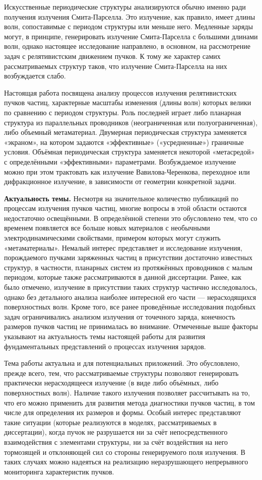 Искусственные периодические структуры анализируются обычно именно ради получения излучения Смита-Парселла. Это излучение, как правило, имеет длины волн, сопоставимые с периодом структуры или меньше него. Медленные заряды могут, в принципе, генерировать излучение Смита-Парселла с большими длинами волн, однако настоящее исследование направлено, в основном, на рассмотрение задач с релятивистским движением пучков. К тому же характер самих рассматриваемых структур таков, что излучение Смита-Парселла на них возбуждается слабо.  

Настоящая работа посвящена анализу процессов излучения релятивистских пучков частиц, характерные масштабы изменения (длины волн) которых велики по сравнению с периодом структуры. Роль последней играет либо планарная структура из параллельных проводников (неограниченная или полуограниченная), либо объемный метаматериал. Двумерная периодическая структура заменяется «экраном», на котором задаются «эффективные» («усредненные») граничные условия. Объёмная периодическая структура заменяется некоторой «метасредой» с определёнными «эффективными» параметрами. Возбуждаемое излучение можно при этом трактовать как излучение Вавилова-Черенкова, переходное или дифракционное излучение, в зависимости от геометрии конкретной задачи.  

\textbf{Актуальность темы.} Несмотря на значительное количество публикаций по процессам излучения пучков частиц, многие вопросы в этой области остаются недостаточно освещёнными. В определённой степени это обусловлено тем, что со временем появляется все больше новых материалов с необычными электродинамическими свойствами, примером которых могут служить «метаматериалы». Немалый интерес представляет и исследование излучения, порождаемого пучками заряженных частиц в присутствии достаточно известных структур, в частности, планарных систем из протяжённых проводников с малым периодом, которые также рассматриваются в данной диссертации. Ранее, как было отмечено, излучение в присутствии таких структур частично исследовалось, однако без детального анализа наиболее интересной его части — нерасходящихся поверхностных волн. Кроме того, все ранее проведённые исследования подобных задач ограничивались анализом излучения от точечного заряда, конечность размеров пучков частиц не принималась во внимание. Отмеченные выше факторы указывают на актуальность темы настоящей работы для развития фундаментальных представлений о процессах излучения зарядов.  

Тема работы актуальна и для потенциальных приложений. Это обусловлено, прежде всего, тем, что рассматриваемые структуры позволяют генерировать практически нерасходящееся излучение (в виде либо объёмных, либо поверхностных волн). Наличие такого излучения позволяет рассчитывать на то, что его можно применить для развития метода диагностики пучков частиц, в том числе для определения их размеров и формы. Особый интерес представляют такие ситуации (которые реализуются в моделях, рассматриваемых в диссертации), когда пучок не разрушается ни за счёт непосредственного взаимодействия с элементами структуры, ни за счёт воздействия на него тормозящей и отклоняющей сил со стороны генерируемого поля излучения. В таких случаях можно надеяться на реализацию неразрушающего непрерывного мониторинга характеристик пучков. 

